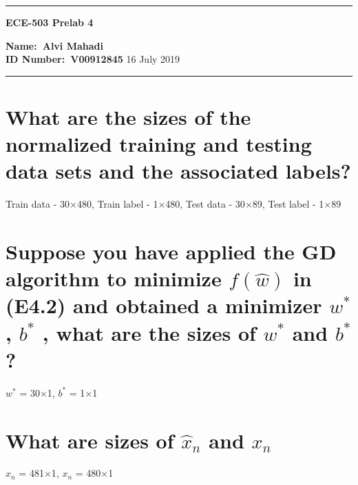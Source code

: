 \documentclass[11pt,a4paper,twoside]{article}
\begin{document}
\begin{center}
\hrule

\vspace{.4cm}
{\bf {\Huge ECE-503 Prelab 4}}
\vspace{.2cm}
\end{center}
{\bf Name:\ Alvi Mahadi }  \\
{\bf ID Number:\ V00912845} \hspace{\fill} 16 July 2019 \\
\hrule


\section{What are the sizes of the normalized training and testing data sets and the associated labels?}
Train data - 30$\times$480, Train label - 1$\times$480, Test data - 30$\times$89, Test label - 1$\times$89
\section{Suppose you have applied the GD algorithm to minimize $f(\hat{w})$ in (E4.2) and obtained a minimizer $w^{*}$, $b^{*}$ , what are the sizes of $w^{*}$ and $b^{*}$?}
$w^{*}$ = 30$\times$1, $b^{*}$ = 1$\times$1 
\section{What are sizes of $\hat{x}_n$ and $x_n$}
$\hat{x}_n$ = 481$\times$1, $x_n$ = 480$\times$1
\end{document}
